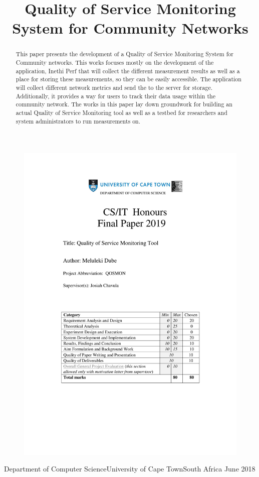 \documentclass[plain]{sigplanconf}
\begin{document}
	\begin{figure}
		\centering
		\includegraphics{cover_page.pdf}
	\end{figure}
	\title{Quality of Service Monitoring System for Community Networks}
	{Department of Computer Science\linebreak University of Cape Town\linebreak South Africa}
	{June 2018}
	\maketitle
	\begin{abstract}
		This paper presents the development of a Quality of Service Monitoring System for Community networks.
		This works focuses mostly on the development of the application, Inethi Perf that will collect the different measurement results as well as a place for storing these measurements, so they can be easily accessible.
		The application will collect different network metrics and send the to the server for storage.
		Additionally, it provides a way for users to track their data usage within the community network.
		The works in this paper lay down groundwork for building an actual Quality of Service Monitoring tool as well as a testbed for researchers and system administrators to run measurements on.
	\end{abstract}
\end{document}
